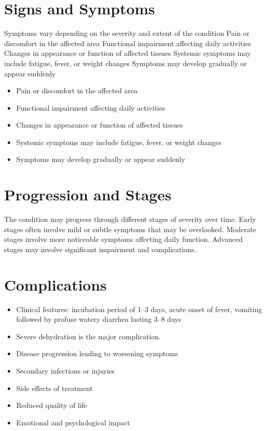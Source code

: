 \section{Signs and Symptoms}
Symptoms vary depending on the severity and extent of the condition Pain or discomfort in the affected area Functional impairment affecting daily activities Changes in appearance or function of affected tissues Systemic symptoms may include fatigue, fever, or weight changes Symptoms may develop gradually or appear suddenly

\begin{itemize}[noitemsep]
  \item Pain or discomfort in the affected area
  \item Functional impairment affecting daily activities
  \item Changes in appearance or function of affected tissues
  \item Systemic symptoms may include fatigue, fever, or weight changes
  \item Symptoms may develop gradually or appear suddenly
\end{itemize}
\section{Progression and Stages}
The condition may progress through different stages of severity over time. Early stages often involve mild or subtle symptoms that may be overlooked. Moderate stages involve more noticeable symptoms affecting daily function. Advanced stages may involve significant impairment and complications.
\section{Complications}
\begin{itemize}[noitemsep]
  \item Clinical features: incubation period of 1--3 days, acute onset of fever, vomiting followed by profuse watery diarrhea lasting 3--8 days
  \item Severe dehydration is the major complication.
  \item Disease progression leading to worsening symptoms
  \item Secondary infections or injuries
  \item Side effects of treatment
  \item Reduced quality of life
  \item Emotional and psychological impact
\end{itemize}
